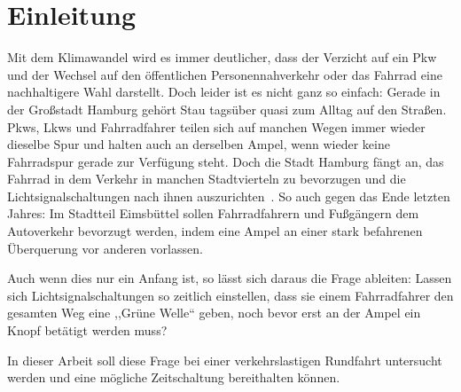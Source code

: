 %
\chapter{Einleitung}\label{ch:einleitung}

Mit dem Klimawandel wird es immer deutlicher, dass der Verzicht auf ein Pkw und der Wechsel auf den öffentlichen Personennahverkehr oder das Fahrrad eine nachhaltigere Wahl darstellt.
Doch leider ist es nicht ganz so einfach: Gerade in der Großstadt Hamburg gehört Stau tagsüber quasi zum Alltag auf den Straßen.
Pkws, Lkws und Fahrradfahrer teilen sich auf manchen Wegen immer wieder dieselbe Spur und halten auch an derselben Ampel, wenn wieder keine Fahrradspur gerade zur Verfügung steht.
Doch die Stadt Hamburg fängt an, das Fahrrad in dem Verkehr in manchen Stadtvierteln zu bevorzugen und die Lichtsignalschaltungen nach ihnen auszurichten~\cite{NDR2022}.
So auch gegen das Ende letzten Jahres: Im Stadtteil Eimsbüttel sollen Fahrradfahrern und Fußgängern dem Autoverkehr bevorzugt werden, indem eine Ampel an einer stark befahrenen Überquerung vor anderen vorlassen.

Auch wenn dies nur ein Anfang ist, so lässt sich daraus die Frage ableiten: Lassen sich Lichtsignalschaltungen so zeitlich einstellen, dass sie einem Fahrradfahrer den gesamten Weg eine ,,Grüne Welle`` geben, noch bevor erst an der Ampel ein Knopf betätigt werden muss?

In dieser Arbeit soll diese Frage bei einer verkehrslastigen Rundfahrt untersucht werden und eine mögliche Zeitschaltung bereithalten können.




